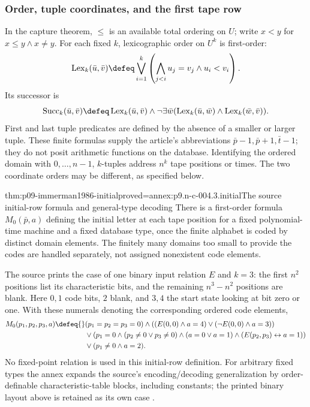 \subsubsection{Order, tuple coordinates, and the first tape row}

In the capture theorem, \(\leq\) is an available total ordering on
\(U\); write \(x<y\) for \(x\leq y\land x\ne y\).
For each fixed \(k\), lexicographic order on \(U^k\) is first-order:
\[
 \operatorname{Lex}_k(\bar u,\bar v)\defeq
 \bigvee_{i=1}^k\left(\bigwedge_{j<i}u_j=v_j\land u_i<v_i\right).
\]
Its successor is
\[
 \operatorname{Succ}_k(\bar u,\bar v)\defeq
 \operatorname{Lex}_k(\bar u,\bar v)\land
 \neg\exists\bar w(
   \operatorname{Lex}_k(\bar u,\bar w)\land
   \operatorname{Lex}_k(\bar w,\bar v)).
\]
First and last tuple predicates are defined by the absence of a smaller
or larger tuple.  These finite formulas supply the article's abbreviations
\(\bar p-1,\bar p+1,\bar t-1\); they do not posit arithmetic
functions on the database.  Identifying the ordered domain with
\(0,\ldots,n-1\), \(k\)-tuples address \(n^k\) tape positions
or times.  The two coordinate orders may be different, as specified below.

\begin{hblemma}{thm:p09-immerman1986-initial}{proved=annex:p9.n-c-004.3.initial}{The source initial-row formula and general-type decoding}
There is a first-order formula \(M_0(\bar p,a)\) defining the initial
letter at each tape position for a fixed polynomial-time machine and a
fixed database type, once the finite alphabet is coded by distinct domain
elements.  The finitely many domains too small to provide the codes are
handled separately, not assigned nonexistent code elements.

The source prints the case of one binary input relation \(E\) and
\(k=3\): the first \(n^2\) positions list its characteristic bits,
and the remaining \(n^3-n^2\) positions are blank.  Here
\(0,1\) code bits, \(2\) blank, and \(3,4\) the start state
looking at bit zero or one.  With these numerals denoting the corresponding
ordered code elements,
\[
\begin{split}
 M_0(p_1,p_2,p_3,a)\defeq{}&
 (p_1=p_2=p_3=0)\land
  ((E(0,0)\land a=4)\lor(\neg E(0,0)\land a=3))\\
 &{}\lor(p_1=0\land(p_2\ne0\lor p_3\ne0)
       \land(a=0\lor a=1)
       \land(E(p_2,p_3)\leftrightarrow a=1))\\
 &{}\lor(p_1\ne0\land a=2).
\end{split}
\]
No fixed-point relation is used in this initial-row definition.
For arbitrary fixed types the annex expands the source's
encoding/decoding generalization by order-definable characteristic-table
blocks, including constants; the printed binary layout above is retained
as its own case \cite[lem.~3.1]{Immerman1986}.
\end{hblemma}

